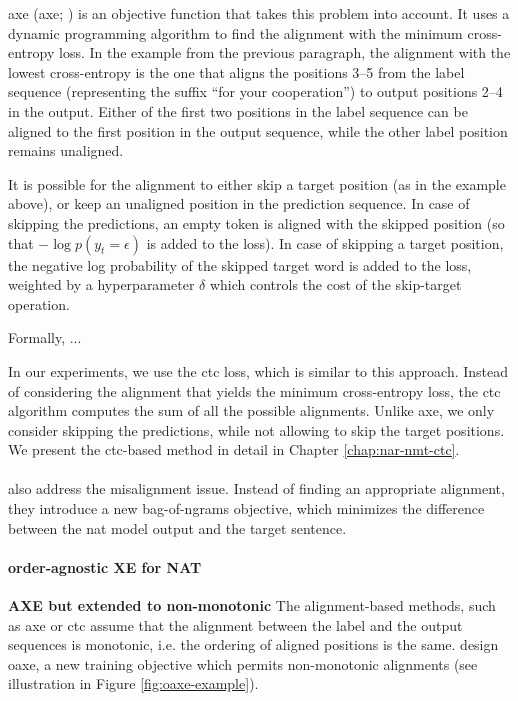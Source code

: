 \Acl{axe}  (\acs{axe}; \citealp{ghazvininejad2020aligned}) is an
objective function that takes this problem into account. It uses a dynamic
programming algorithm to find the alignment with the minimum cross-entropy
loss. In the example from the previous paragraph, the alignment with the lowest
cross-entropy is the one that aligns the positions 3--5 from the label sequence
(representing the suffix ``for your cooperation'') to output positions 2--4 in
the output. Either of the first two positions in the label sequence can be
aligned to the first position in the output sequence, while the other label
position remains unaligned.

It is possible for the alignment to either skip a target position (as in the
example above), or keep an unaligned position in the prediction sequence. In
case of skipping the predictions, an empty token is aligned with the skipped
position (so that $-\log p(y_t = \epsilon)$ is added to the loss). In case of
skipping a target position, the negative log probability of the skipped target
word is added to the loss, weighted by a hyperparameter $\delta$ which controls
the cost of the skip-target operation.

Formally, ... 

In our experiments, we use the \ac{ctc} loss, which is similar to this
approach. Instead of considering the alignment that yields the minimum
cross-entropy loss, the \ac{ctc} algorithm computes the sum of all the possible
alignments. Unlike \ac{axe}, we only consider skipping the predictions, while
not allowing to skip the target positions. We present the \ac{ctc}-based method
in detail in Chapter \ref{chap:nar-nmt-ctc}.


\paragraph{} \citet{shao2020minimizing} also address the
misalignment issue. Instead of finding an appropriate alignment, they introduce
a new bag-of-ngrams objective, which minimizes the difference between the
\ac{nat} model output and the target sentence. 

\paragraph{order-agnostic XE for NAT} \textbf{AXE but extended to non-monotonic}
The alignment-based methods, such as \ac{axe} or \ac{ctc} assume that the
alignment between the label and the output sequences is monotonic, i.e. the
ordering of aligned positions is the same. \citet{du2021orderagnostic} design
\ac{oaxe}, a new training objective which permits non-monotonic alignments (see
illustration in Figure \ref{fig:oaxe-example}).


